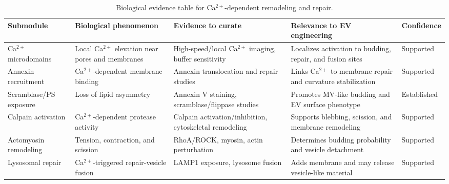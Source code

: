 \begin{table}[t]
\footnotesize\sf
\centering
\caption{Biological evidence table for Ca$^{2+}$-dependent remodeling and repair.\label{T_A7_bio_remodel_repair}}
\begin{tabular}{p{2.7cm} p{3.4cm} p{4.2cm} p{3.0cm} p{2.0cm}}
\toprule
\textbf{Submodule} & \textbf{Biological phenomenon} & \textbf{Evidence to curate} & \textbf{Relevance to EV engineering} & \textbf{Confidence} \\
\midrule
Ca$^{2+}$ microdomains & Local Ca$^{2+}$ elevation near pores and membranes & High-speed/local Ca$^{2+}$ imaging, buffer sensitivity & Localizes activation to budding, repair, and fusion sites & Supported \cite{scheffer2014mechanism,shukla2022vitro} \\
Annexin recruitment & Ca$^{2+}$-dependent membrane binding & Annexin translocation and repair studies & Links Ca$^{2+}$ to membrane repair and curvature stabilization & Supported \cite{boye2017annexin,mularski2022interplay,hakamiZanjani2024modulation,muratori2021role,sonder2019annexin} \\
Scramblase/PS exposure & Loss of lipid asymmetry & Annexin V staining, scramblase/flippase studies & Promotes MV-like budding and EV surface phenotype & Established \cite{muratori2017activation,wang2025loss,han2019chemically,silkunas2026peculiarities,segawa2016human} \\
Calpain activation & Ca$^{2+}$-dependent protease activity & Calpain activation/inhibition, cytoskeletal remodeling & Supports blebbing, scission, and membrane remodeling & Supported \cite{williams2025calpains,campbell2012structure,roberts2020ca} \\
Actomyosin remodeling & Tension, contraction, and scission & RhoA/ROCK, myosin, actin perturbation & Determines budding probability and vesicle detachment & Supported \cite{hellwich2026extracellular,pakhomov2014disassembly,rassokhin2014cellular} \\
Lysosomal repair & Ca$^{2+}$-triggered repair-vesicle fusion & LAMP1 exposure, lysosome fusion & Adds membrane and may release vesicle-like material & Supported \cite{andrews2014damage,castroGomes2016plasma,verderio2018role,rosato2021two,radulovic2018escrt} \\
\bottomrule
\end{tabular}
\end{table}


